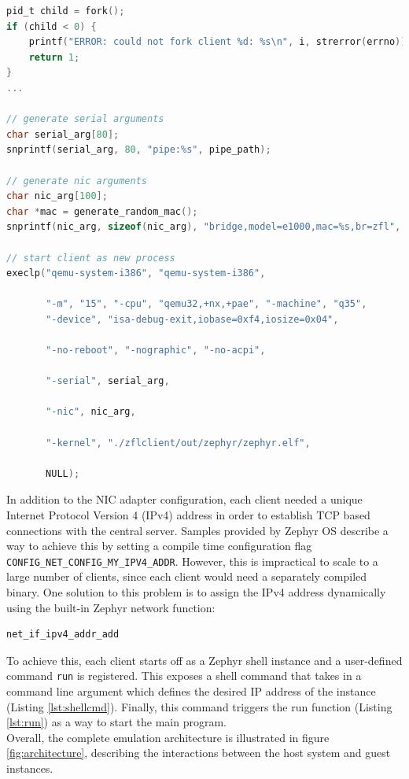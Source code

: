 \documentclass[12pt]{article}
\begin{document}
\begin{lstlisting}[language=C,caption=Client forking process,label={lst:fork}]
pid_t child = fork();
if (child < 0) {
    printf("ERROR: could not fork client %d: %s\n", i, strerror(errno));
    return 1;
}
...

// generate serial arguments
char serial_arg[80];
snprintf(serial_arg, 80, "pipe:%s", pipe_path);

// generate nic arguments
char nic_arg[100];
char *mac = generate_random_mac();
snprintf(nic_arg, sizeof(nic_arg), "bridge,model=e1000,mac=%s,br=zfl", mac);

// start client as new process
execlp("qemu-system-i386", "qemu-system-i386",

       "-m", "15", "-cpu", "qemu32,+nx,+pae", "-machine", "q35",
       "-device", "isa-debug-exit,iobase=0xf4,iosize=0x04",

       "-no-reboot", "-nographic", "-no-acpi",

       "-serial", serial_arg,

       "-nic", nic_arg,

       "-kernel", "./zflclient/out/zephyr/zephyr.elf",

       NULL);
\end{lstlisting}

In addition to the NIC adapter configuration, each client needed a unique Internet Protocol Version
4 (IPv4) address in order to establish TCP based connections with the central server. Samples
provided by Zephyr OS describe a way to achieve this by setting a compile time configuration flag\\
\verb|CONFIG_NET_CONFIG_MY_IPV4_ADDR|. However, this is impractical to scale to a large number of clients, since
each client would need a separately compiled binary. One solution to this problem is to assign the IPv4 address
dynamically using the built-in Zephyr network function\cite{schirrmeister_2020_simulation}:
\begin{verbatim}
net_if_ipv4_addr_add
\end{verbatim}
To achieve this, each client starts off as a Zephyr shell instance and a user-defined command
\verb|run| is registered. This exposes a shell command that takes in a command line argument which defines the desired IP address of the
instance (Listing \ref{lst:shellcmd}). Finally, this command triggers the run function
(Listing \ref{lst:run}) as a way to start the main program. \\

Overall, the complete emulation architecture is illustrated in figure \ref{fig:architecture},
describing the interactions between the host system and guest instances. \\
\end{document}
